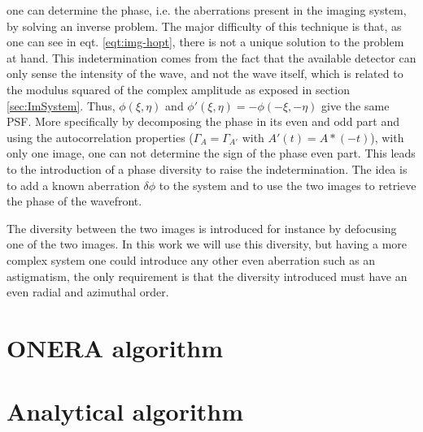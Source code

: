 one can determine the phase, i.e. the aberrations present in the imaging system, by solving an inverse problem. The major difficulty of this technique is that, as one can see in eqt. \eqref{eqt:img-hopt}, there is not a unique solution to the problem at hand. This indetermination comes from the fact that the available detector can only sense the intensity of the wave, and not the wave itself, which is related to the modulus squared of the complex amplitude as exposed in section \ref{sec:ImSystem}. Thus, $\phi(\xi,\eta)$ and $\phi'(\xi,\eta)=-\phi(-\xi,-\eta)$ give the same PSF.
More specifically by decomposing the phase in its even and odd part and using the autocorrelation properties ($\Gamma_A = \Gamma_{A'}$ with $A'(t) = A*(-t)$), with only one image, one can not determine the sign of the phase even part. This leads to the introduction of a phase diversity to raise the indetermination. The idea is to add a known aberration $\delta\phi$ to the system and to use the two images to retrieve the phase of the wavefront.

The diversity between the two images is introduced for instance by defocusing one of the two images. In this work we will use this diversity, but having a more complex system one could introduce any other even aberration such as an astigmatism, the only requirement is that the diversity introduced must have an even radial and azimuthal order. 

\section{ONERA algorithm}

\section{Analytical algorithm}